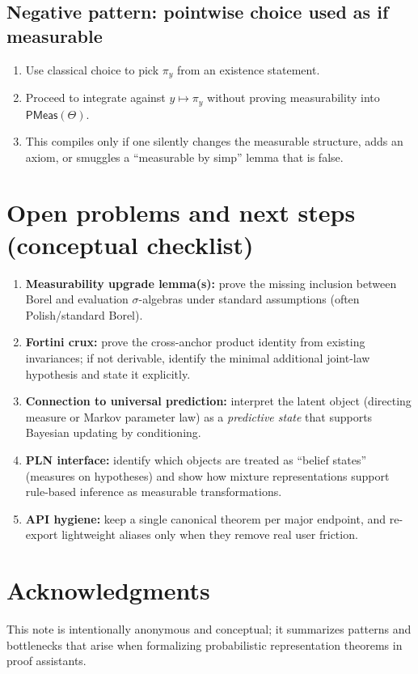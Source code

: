 \documentclass[11pt]{article}
\newcommand{\ProbMeas}{\mathsf{PMeas}}
\begin{document}
\subsection{Negative pattern: pointwise choice used as if measurable}
\begin{enumerate}[label=(\roman*)]
\item Use classical choice to pick $\pi_y$ from an existence statement.
\item Proceed to integrate against $y\mapsto \pi_y$ without proving measurability into $\ProbMeas(\Theta)$.
\item This compiles only if one silently changes the measurable structure, adds an axiom, or smuggles a
``measurable by simp'' lemma that is false.
\end{enumerate}

\section{Open problems and next steps (conceptual checklist)}

\begin{enumerate}[label=\arabic*.]
\item \textbf{Measurability upgrade lemma(s):} prove the missing inclusion between Borel and evaluation
$\sigma$-algebras under standard assumptions (often Polish/standard Borel).
\item \textbf{Fortini crux:} prove the cross-anchor product identity from existing invariances; if not
derivable, identify the minimal additional joint-law hypothesis and state it explicitly.
\item \textbf{Connection to universal prediction:} interpret the latent object (directing measure or
Markov parameter law) as a \emph{predictive state} that supports Bayesian updating by conditioning.
\item \textbf{PLN interface:} identify which objects are treated as ``belief states'' (measures on
hypotheses) and show how mixture representations support rule-based inference as measurable transformations.
\item \textbf{API hygiene:} keep a single canonical theorem per major endpoint, and re-export lightweight
aliases only when they remove real user friction.
\end{enumerate}

\section*{Acknowledgments}
This note is intentionally anonymous and conceptual; it summarizes patterns and bottlenecks that arise
when formalizing probabilistic representation theorems in proof assistants.
\end{document}

